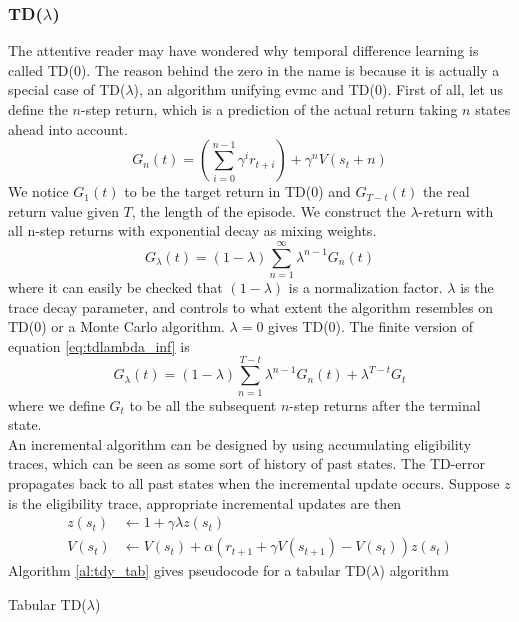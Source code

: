 \subsubsection*{TD($\lambda$)}
The attentive reader may have wondered why temporal difference learning is called TD(0). The reason behind the zero in the name is because it is actually a special case of TD($\lambda$), an algorithm unifying \gls{evmc} and TD(0). First of all, let us define the $n$-step return, which is a prediction of the actual return taking $n$ states ahead into account.
\begin{equation}
\label{eq:nstep}
G_n(t)=\left(\sum_{i=0}^{n-1}\gamma^i r_{t+i}\right)+\gamma^n V(s_t+n)
\end{equation}
We notice $G_1(t)$ to be the target return in TD(0) and $G_{T-t}(t)$ the real return value given $T$, the length of the episode. We construct the $\lambda$-return with all n-step returns with exponential decay as mixing weights.
\begin{equation}
\label{eq:tdlambda_inf}
G_{\lambda}(t)=(1-\lambda) \sum_{n=1}^{\infty} \lambda^{n-1}G_n(t)
\end{equation}
where it can easily be checked that $(1-\lambda)$ is a normalization factor. $\lambda$ is the trace decay parameter, and controls to what extent the algorithm resembles on TD(0) or a Monte Carlo algorithm. $\lambda=0$ gives TD(0). The finite version of equation \ref{eq:tdlambda_inf} is
\begin{equation}
\label{eq:tdlambda_fin}
G_{\lambda}(t)=(1-\lambda) \sum_{n=1}^{T-t} \lambda^{n-1}G_n(t) + \lambda^{T-t} G_t
\end{equation}
where we define $G_t$ to be all the subsequent $n$-step returns after the terminal state. \\
An incremental algorithm can be designed by using accumulating eligibility traces, which can be seen as some sort of history of past states. The TD-error propagates back to all past states when the incremental update occurs. Suppose $z$ is the eligibility trace, appropriate incremental updates are then \cite{sutton98}
\begin{align}
z(s_t) &\leftarrow 1+\gamma \lambda z(s_t) \\
V(s_t) &\leftarrow V(s_t)+\alpha\left(r_{t+1}+\gamma V(s_{t+1}) -V(s_t)\right)z(s_t)
\end{align}
Algorithm \ref{al:tdy_tab} gives pseudocode for a tabular TD($\lambda$) algorithm 

\begin{algorithm}
\begin{algorithmic}
\ENDFOR
\end{algorithmic}
\caption{Tabular TD($\lambda$)}
\label{al:tdy_tab}
\end{algorithm}

